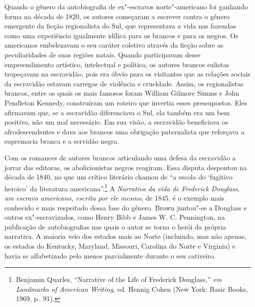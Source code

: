 Quando o gênero da autobiografia de ex"-escravos norte"-americano foi
ganhando forma na década de 1820, os autores começaram a escrever contra
o gênero emergente da ficção regionalista do Sul, que representava a
vida nas fazendas como uma experiência igualmente idílica para os
brancos e para os negros. Os
americanos embelezavam o seu caráter coletivo através da ficção sobre as
peculiaridades de suas regiões natais. Quando participavam desse
empreendimento artístico, intelectual e político, os autores brancos
sulistas tropeçavam na escravidão, pois era óbvio para os visitantes que
as relações sociais da escravidão estavam carregas de violência e
crueldade. Assim, os regionalistas brancos, entre os quais os mais
famosos foram William Gilmore Simms e John Pendleton Kennedy,
construíram um roteiro que invertia esses pressupostos. Eles afirmavam
que, se a escravidão diferenciava o Sul, ela também era um bem positivo,
não um mal necessário. Em sua visão, a escravidão beneficiava os
afrodescendentes e dava aos brancos uma obrigação paternalista que
reforçava a supremacia branca e a servidão negra.

Com os romances de autores brancos articulando uma defesa da escravidão
a jorrar das editoras, os abolicionistas negros reagiram. Essa disputa
despontou na década de 1840, no que um crítico literário chamou de ``a
escola do `fugitivo heroico' da literatura americana''.\footnote{Benjamin
  Quarles, ``Narrative of the Life of Frederick Douglass,'' \emph{em
  Landmarks of American Writing}, ed. Hennig Cohen (New York: Basic
  Books, 1969, p.~91).} A \emph{Narrativa da vida de Frederick Douglass, um
escravo americano, escrita por ele mesmo}, de 1845, é o exemplo mais
conhecido e mais respeitado dessa fase do gênero. Brown juntou"-se a
Douglass e outros ex"-escravizados, como Henry Bibb e James W. C. Pennington,
na publicação de autobiografias nas quais o autor se
torna o herói da própria narrativa. A maioria veio dos estados mais ao
Norte (incluindo, mas não apenas, os estados do Kentucky, Maryland,
Missouri, Carolina do Norte e Virgínia) e havia se alfabetizado pelo
menos parcialmente durante o seu cativeiro.


